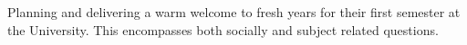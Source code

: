 
Planning and delivering a warm welcome to fresh years for their first semester at the University. This encompasses both socially and subject related questions.

\divider

